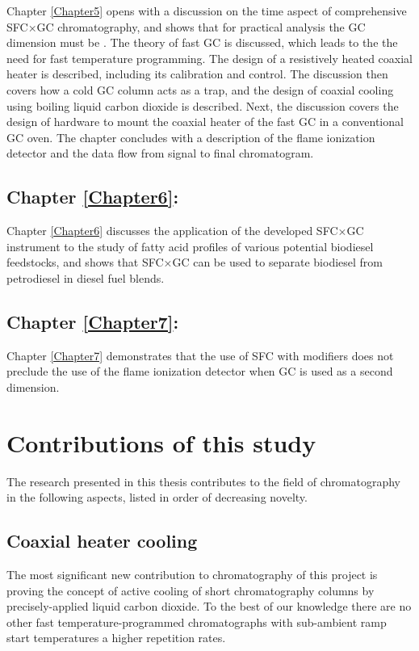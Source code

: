 Chapter \ref{Chapter5} opens with a discussion on the time aspect of
comprehensive SFC×GC chromatography, and shows that for practical analysis the
GC dimension must be . The theory of fast GC is discussed, which
leads to the the need for fast temperature programming. The design of a
resistively heated coaxial heater is described, including its calibration and
control. The discussion then covers how a cold GC column acts as a trap, and the
design of coaxial cooling using boiling liquid carbon dioxide is described.
Next, the discussion covers the design of hardware to mount the coaxial heater
of the fast GC in a conventional GC oven. The chapter concludes with a
description of the flame ionization detector and the data flow from signal to
final chromatogram.

\subsection{Chapter \ref{Chapter6}:  }

Chapter \ref{Chapter6} discusses the application of the developed SFC×GC
instrument to the study of fatty acid profiles of various potential biodiesel
feedstocks, and shows that SFC×GC can be used to separate biodiesel from
petrodiesel in diesel fuel blends.

\subsection{Chapter \ref{Chapter7}:  }

Chapter \ref{Chapter7} demonstrates that the use of SFC with modifiers does not
preclude the use of the flame ionization detector when GC is used as a second
dimension.

\section{Contributions of this study}

The research presented in this thesis contributes to the field of chromatography
in the following aspects, listed in order of decreasing novelty.

\subsection{Coaxial heater cooling}

The most significant new contribution to chromatography of this project is
proving the concept of active cooling of short chromatography columns by
precisely-applied liquid carbon dioxide. To the best of our knowledge there are
no other fast temperature-programmed chromatographs with sub-ambient ramp start
temperatures a higher repetition rates.

